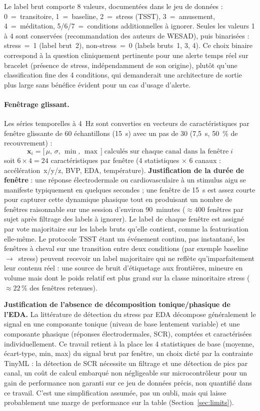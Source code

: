 \documentclass{acmart}
\begin{document}
Le label brut comporte 8 valeurs, documentées dans le jeu de données :
0~=~transitoire, 1~=~baseline, 2~=~stress (TSST), 3~=~amusement,
4~=~méditation, 5/6/7~=~conditions additionnelles à ignorer. Seules les
valeurs 1 à 4 sont conservées (recommandation des auteurs de WESAD), puis
binarisées : stress~=~1 (label brut~2), non-stress~=~0 (labels bruts~1, 3,
4). Ce choix binaire correspond à la question cliniquement pertinente pour
une alerte temps réel sur bracelet (présence de stress, indépendamment de
son origine), plutôt qu'une classification fine des 4 conditions, qui
demanderait une architecture de sortie plus large sans bénéfice évident pour
un cas d'usage d'alerte.

\paragraph{Fenêtrage glissant.} Les séries temporelles à 4~Hz sont converties
en vecteurs de caractéristiques par fenêtre glissante de 60 échantillons
(15~s) avec un pas de 30 (7,5~s, 50~\% de recouvrement) :
\begin{equation}
  \mathbf{x}_i = \bigl[\,\mu,\, \sigma,\, \min,\, \max\,\bigr]
  \;\text{calculés sur chaque canal dans la fenêtre}\; i
  \label{eq:features}
\end{equation}
soit $6 \times 4 = 24$ caractéristiques par fenêtre (4 statistiques $\times$
6 canaux : accélération~x/y/z, BVP, EDA, température).
\textbf{Justification de la durée de fenêtre} : une réponse
électrodermale ou cardiovasculaire à un stimulus aigu se manifeste
typiquement en quelques secondes ; une fenêtre de 15~s est assez courte pour
capturer cette dynamique phasique tout en produisant un nombre de fenêtres
raisonnable sur une session d'environ 90~minutes ($\approx 400$ fenêtres par
sujet après filtrage des labels à ignorer). Le label de chaque fenêtre est
assigné par vote majoritaire sur les labels bruts qu'elle contient, comme la
featurisation elle-même. Le protocole TSST étant un événement continu, pas
instantané, les fenêtres à cheval sur une transition entre deux conditions
(par exemple baseline~$\to$~stress) peuvent recevoir un label majoritaire
qui ne reflète qu'imparfaitement leur contenu réel : une source de bruit
d'étiquetage aux frontières, mineure en volume mais dont le poids relatif
est plus grand sur la classe minoritaire stress ($\approx 22\,\%$ des
fenêtres retenues).

\textbf{Justification de l'absence de décomposition tonique/phasique de
l'EDA.} La littérature de détection du stress par EDA décompose
généralement le signal en une composante tonique (niveau de base lentement
variable) et une composante phasique (réponses électrodermales, SCR),
comptées et caractérisées individuellement. Ce travail retient à la place
les 4 statistiques de base (moyenne, écart-type, min, max) du signal brut
par fenêtre, un choix dicté par la contrainte TinyML : la détection de SCR
nécessite un filtrage et une détection de pics par canal, un coût de calcul
embarqué non négligeable sur microcontrôleur pour un gain de performance non
garanti sur ce jeu de données précis, non quantifié dans ce travail. C'est
une simplification assumée, pas un oubli, mais qui laisse probablement une
marge de performance sur la table (Section~\ref{sec:limits}).
\end{document}
